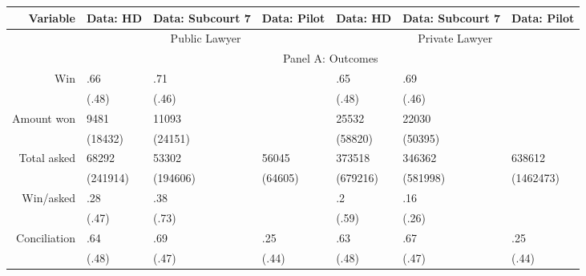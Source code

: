 \begin{tabular}{rrrrrrr}
\toprule
Variable & Data: HD & Data: Subcourt 7 & Data: Pilot & Data: HD & Data: Subcourt 7 & Data: Pilot \\
\toprule
      & \multicolumn{3}{c}{Public Lawyer} & \multicolumn{3}{c}{Private Lawyer} \\
      \midrule
      & \multicolumn{6}{c}{Panel A: Outcomes} \\
      \midrule
      \midrule
Win   & \multicolumn{1}{l}{.66} & \multicolumn{1}{l}{.71} & \multicolumn{1}{l}{} & \multicolumn{1}{l}{.65} & \multicolumn{1}{l}{.69} & \multicolumn{1}{l}{} \\
      & \multicolumn{1}{l}{(.48)} & \multicolumn{1}{l}{(.46)} & \multicolumn{1}{l}{} & \multicolumn{1}{l}{(.48)} & \multicolumn{1}{l}{(.46)} & \multicolumn{1}{l}{} \\
Amount won & \multicolumn{1}{l}{9481} & \multicolumn{1}{l}{11093} & \multicolumn{1}{l}{} & \multicolumn{1}{l}{25532} & \multicolumn{1}{l}{22030} & \multicolumn{1}{l}{} \\
      & \multicolumn{1}{l}{(18432)} & \multicolumn{1}{l}{(24151)} & \multicolumn{1}{l}{} & \multicolumn{1}{l}{(58820)} & \multicolumn{1}{l}{(50395)} & \multicolumn{1}{l}{} \\
Total asked & \multicolumn{1}{l}{68292} & \multicolumn{1}{l}{53302} & \multicolumn{1}{l}{56045} & \multicolumn{1}{l}{373518} & \multicolumn{1}{l}{346362} & \multicolumn{1}{l}{638612} \\
      & \multicolumn{1}{l}{(241914)} & \multicolumn{1}{l}{(194606)} & \multicolumn{1}{l}{(64605)} & \multicolumn{1}{l}{(679216)} & \multicolumn{1}{l}{(581998)} & \multicolumn{1}{l}{(1462473)} \\
Win/asked & \multicolumn{1}{l}{.28} & \multicolumn{1}{l}{.38} & \multicolumn{1}{l}{} & \multicolumn{1}{l}{.2} & \multicolumn{1}{l}{.16} & \multicolumn{1}{l}{} \\
      & \multicolumn{1}{l}{(.47)} & \multicolumn{1}{l}{(.73)} & \multicolumn{1}{l}{} & \multicolumn{1}{l}{(.59)} & \multicolumn{1}{l}{(.26)} & \multicolumn{1}{l}{} \\
Conciliation  & \multicolumn{1}{l}{.64} & \multicolumn{1}{l}{.69} & \multicolumn{1}{l}{.25} & \multicolumn{1}{l}{.63} & \multicolumn{1}{l}{.67} & \multicolumn{1}{l}{.25} \\
      & \multicolumn{1}{l}{(.48)} & \multicolumn{1}{l}{(.47)} & \multicolumn{1}{l}{(.44)} & \multicolumn{1}{l}{(.48)} & \multicolumn{1}{l}{(.47)} & \multicolumn{1}{l}{(.44)} \\

\end{tabular}
